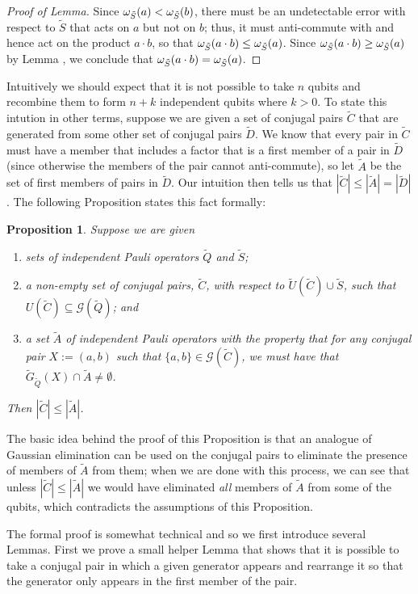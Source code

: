 \documentclass[twocolumn,showpacs,preprintnumbers,amsmath,amssymb,nofootinbib,pra,floatfix]{revtex4-1}
\newtheorem{proposition}{Proposition}
\newenvironment{remark}[1][Remark]{\begin{trivlist}
\item[\hskip \labelsep {\bfseries #1}]}{\end{trivlist}}
\newcommand{\set}{\tilde}
\newcommand{\genfun}{\mathcal{G}}
\begin{document}
\begin{proof}[Proof of Lemma]
Since $\om_{\set S}(a)<\om_{\set S}(b)$, there must be an undetectable error with respect to $\set S$ that acts on $a$ but not on $b$;  thus, it must anti-commute with and hence act on the product $a\cdot b$, so that $\om_{\set S}(a\cdot b)\le \om_{\set S}(a)$.  Since $\om_{\set S}(a\cdot b)\ge \om_{\set S}(a)$ by Lemma , we conclude that $\om_{\set S}(a\cdot b) = \om_{\set S}(a)$.
\end{proof}
\begin{remark}
Intuitively we should expect that it is not possible to take $n$ qubits and recombine them to form $n+k$ independent qubits where $k>0$.  To state this intution in other terms, suppose we are given a set of conjugal pairs $\set C$ that are generated from some other set of conjugal pairs $\set D$.  We know that every pair in $\set C$ must have a member that includes a factor that is a first member of a pair in $\set D$ (since otherwise the members of the pair cannot anti-commute), so let $\set A$ be the set of first members of pairs in $\set D$.  Our intuition then tells us that $|\set C|\le |\set A|=|\set D|$.  The following Proposition states this fact formally:
\end{remark}
\begin{proposition}
\label{bound-on-recombinations}
Suppose we are given
\begin{enumerate}
\item sets of independent Pauli operators $\set Q$ and $\set S$;
\item a non-empty set of conjugal pairs, $\set C$, with respect to $\set U(\set C) \cup \set S$, such that $U(\set C)\subseteq \genfun(\set Q)$; and
\item a set $\set A$ of independent Pauli operators with the property that for any conjugal pair $X:=(a,b)$ such that $\{a,b\}\in\genfun(\set C)$, we must have that $\set G_{\set Q}(X) \cap \set A \ne \emptyset$.
\end{enumerate}
Then $|\set C|\le|\set A|$.
\end{proposition}
\begin{remark}
The basic idea behind the proof of this Proposition is that an analogue of Gaussian elimination can be used on the conjugal pairs to eliminate the presence of members of $\set A$ from them;  when we are done with this process, we can see that unless $|\set C|\le |\set A|$ we would have eliminated \emph{all} members of $\set A$ from some of the qubits, which contradicts the assumptions of this Proposition.

The formal proof is somewhat technical and so we first introduce several Lemmas.  First we prove a small helper Lemma that shows that it is possible to take a conjugal pair in which a given generator appears and rearrange it so that the generator only appears in the first member of the pair.
\end{remark}
\end{document}
